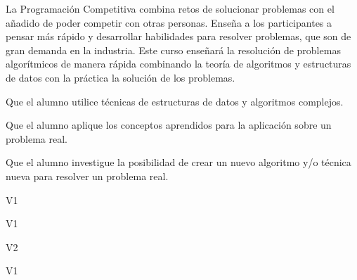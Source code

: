 \begin{syllabus}


\begin{justification}
    La Programación Competitiva combina retos de solucionar problemas con el añadido de poder competir con otras personas. Enseña a los participantes a pensar más rápido y desarrollar habilidades para resolver problemas, que son de gran demanda en la industria. 
    Este curso enseñará la resolución de problemas algorítmicos de manera rápida combinando la teoría de algoritmos y estructuras de datos con la práctica la solución de los problemas.
  \end{justification}
  
  \begin{goals}
    \item Que el alumno utilice técnicas de estructuras de datos y algoritmos complejos.
    \item Que el alumno aplique los conceptos aprendidos para la aplicación sobre un problema real.
    \item Que el alumno investigue la posibilidad de crear un nuevo algoritmo y/o técnica nueva para resolver un problema real.
  \end{goals}
  
  \begin{outcomes}{V1}
      \item {}
      \item {}
  \end{outcomes}
  
  \begin{specificoutcomes}{V1}
    \item {}
    \item {}
  \end{specificoutcomes}

  \begin{outcomes}{V2}
      \item {}
      \item {}
      \item {}
      \item {}
  \end{outcomes}
  
  \begin{competences}{V1}
      \item {}
      \item {}
      \item {}
  \end{competences}
  

\end{syllabus}
